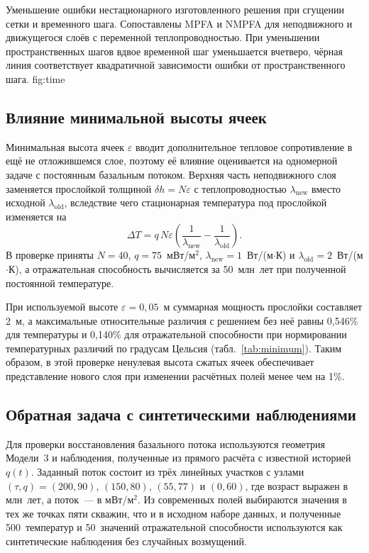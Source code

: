  {Уменьшение ошибки нестационарного изготовленного решения при сгущении сетки и временного шага. Сопоставлены MPFA и NMPFA для неподвижного и движущегося слоёв с переменной теплопроводностью. При уменьшении пространственных шагов вдвое временной шаг уменьшается вчетверо, чёрная линия соответствует квадратичной зависимости ошибки от пространственного шага.} {fig:time}

\subsection{Влияние минимальной высоты ячеек}

Минимальная высота ячеек $\varepsilon$ вводит дополнительное тепловое сопротивление в ещё не отложившемся слое, поэтому её влияние оценивается на одномерной задаче с постоянным базальным потоком. Верхняя часть неподвижного слоя заменяется прослойкой толщиной $\delta h=N\varepsilon$ с теплопроводностью $\lambda_{\mathrm{new}}$ вместо исходной $\lambda_{\mathrm{old}}$, вследствие чего стационарная температура под прослойкой изменяется на
\begin{equation}
 \Delta T = q\,N\varepsilon
 \left(\frac{1}{\lambda_{\mathrm{new}}}
             - \frac{1}{\lambda_{\mathrm{old}}}\right).
\end{equation}
В проверке приняты $N=40$, $q=75$~мВт/м$^2$, $\lambda_{\mathrm{new}}=1$~Вт/(м$\cdot$К) и $\lambda_{\mathrm{old}}=2$~Вт/(м$\cdot$К), а отражательная способность вычисляется за 50~млн~лет при полученной постоянной температуре.

При используемой высоте $\varepsilon=0{,}05$~м суммарная мощность прослойки составляет 2~м, а максимальные относительные различия с решением без неё равны 0,546\% для температуры и 0,140\% для отражательной способности при нормировании температурных различий по градусам Цельсия (табл.~\ref{tab:minimum}). Таким образом, в этой проверке ненулевая высота сжатых ячеек обеспечивает представление нового слоя при изменении расчётных полей менее чем на 1\%.



\subsection{Обратная задача с синтетическими наблюдениями}

Для проверки восстановления базального потока используются геометрия Модели~3 и наблюдения, полученные из прямого расчёта с известной историей $q(t)$. Заданный поток состоит из трёх линейных участков с узлами $(\tau,q)=(200,90)$, $(150,80)$, $(55,77)$ и $(0,60)$, где возраст выражен в млн~лет, а поток~--- в мВт/м$^2$. Из современных полей выбираются значения в тех же точках пяти скважин, что и в исходном наборе данных, и полученные 500~температур и 50~значений отражательной способности используются как синтетические наблюдения без случайных возмущений.

